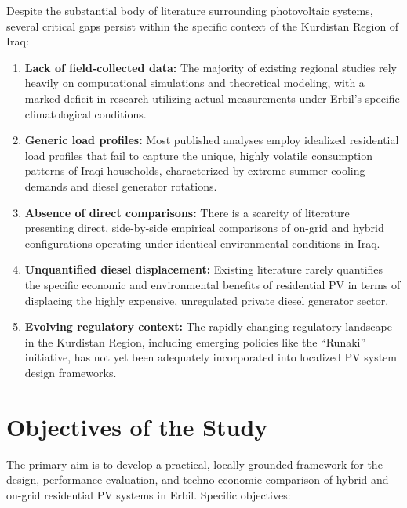 Despite the substantial body of literature surrounding photovoltaic systems, several critical gaps persist within the specific context of the Kurdistan Region of Iraq:

\begin{enumerate}
    \item \textbf{Lack of field-collected data:} The majority of existing regional studies rely heavily on computational simulations and theoretical modeling, with a marked deficit in research utilizing actual measurements under Erbil's specific climatological conditions.
    \item \textbf{Generic load profiles:} Most published analyses employ idealized residential load profiles that fail to capture the unique, highly volatile consumption patterns of Iraqi households, characterized by extreme summer cooling demands and diesel generator rotations.
    \item \textbf{Absence of direct comparisons:} There is a scarcity of literature presenting direct, side-by-side empirical comparisons of on-grid and hybrid configurations operating under identical environmental conditions in Iraq.
    \item \textbf{Unquantified diesel displacement:} Existing literature rarely quantifies the specific economic and environmental benefits of residential PV in terms of displacing the highly expensive, unregulated private diesel generator sector.
    \item \textbf{Evolving regulatory context:} The rapidly changing regulatory landscape in the Kurdistan Region, including emerging policies like the ``Runaki'' initiative, has not yet been adequately incorporated into localized PV system design frameworks.
\end{enumerate}


\section{Objectives of the Study}

The primary aim is to develop a practical, locally grounded framework for the design, performance evaluation, and techno-economic comparison of hybrid and on-grid residential PV systems in Erbil. Specific objectives:

